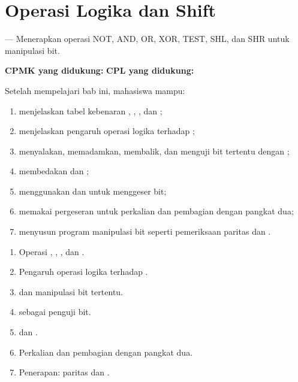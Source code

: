 \documentclass[../../main.tex]{subfiles}
\begin{document}
\chapter{Operasi Logika dan Shift}
\label{chap:logika}


\begin{subcpmkbox}
\vspace{1.1em}
 --- Menerapkan operasi NOT, AND, OR, XOR, TEST, SHL,
dan SHR untuk manipulasi bit.

\vspace{0.4em}
\textbf{CPMK yang didukung:}  \quad\textbullet\quad
\textbf{CPL yang didukung:} 
\end{subcpmkbox}

\begin{tujuanbox}
\vspace{1.1em}
Setelah mempelajari bab ini, mahasiswa mampu:
\begin{enumerate}
    \item menjelaskan tabel kebenaran , ,
          , dan ;
    \item menjelaskan pengaruh operasi logika terhadap
          ;
    \item menyalakan, memadamkan, membalik, dan menguji bit
          tertentu dengan ;
    \item membedakan  dan ;
    \item menggunakan  dan  untuk menggeser bit;
    \item memakai pergeseran untuk perkalian dan pembagian dengan
          pangkat dua;
    \item menyusun program manipulasi bit seperti pemeriksaan
          paritas dan .
\end{enumerate}
\end{tujuanbox}

\begin{materibox}
\vspace{1.1em}
\begin{enumerate}
    \item Operasi , , , dan .
    \item Pengaruh operasi logika terhadap .
    \item {} dan manipulasi bit tertentu.
    \item {} sebagai penguji bit.
    \item {} dan .
    \item Perkalian dan pembagian dengan pangkat dua.
    \item Penerapan: paritas dan .
\end{enumerate}
\end{materibox}










\end{document}
